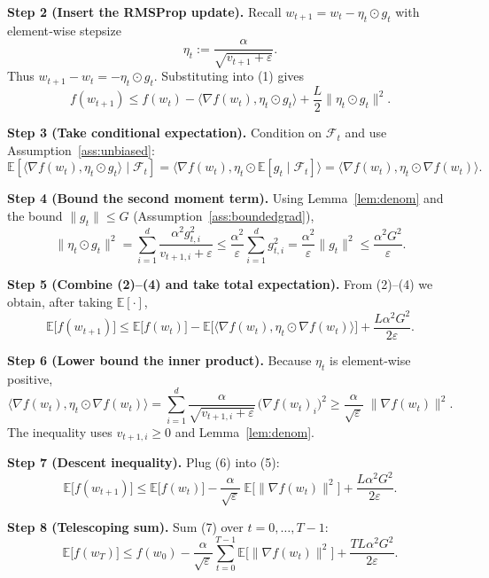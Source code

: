 \documentclass{article}
\newcommand{\EE}{\mathbb{E}}
\begin{document}
\noindent\textbf{Step 2 (Insert the RMSProp update).}  
Recall $w_{t+1}=w_{t}-\eta_{t}\odot g_{t}$ with element‑wise stepsize
\[
\eta_{t}:= \frac{\alpha}{\sqrt{v_{t+1}+\varepsilon}}.
\]
Thus $w_{t+1}-w_{t}= -\eta_{t}\odot g_{t}$. Substituting into (1) gives
\[
f(w_{t+1})\le f(w_{t})
- \big\langle\nabla f(w_{t}),\eta_{t}\odot g_{t}\big\rangle
+ \frac{L}{2}\|\eta_{t}\odot g_{t}\|^{2}.
\tag{2}
\]

\noindent\textbf{Step 3 (Take conditional expectation).}  
Condition on $\mathcal{F}_{t}$ and use Assumption~\ref{ass:unbiased}:
\[
\EE\!\left[\langle\nabla f(w_{t}),\eta_{t}\odot g_{t}\rangle\mid\mathcal{F}_{t}\right]
= \big\langle\nabla f(w_{t}),\eta_{t}\odot \EE[g_{t}\mid\mathcal{F}_{t}]\big\rangle
= \big\langle\nabla f(w_{t}),\eta_{t}\odot \nabla f(w_{t})\big\rangle.
\tag{3}
\]

\noindent\textbf{Step 4 (Bound the second moment term).}  
Using Lemma~\ref{lem:denom} and the bound $\|g_{t}\|\le G$ (Assumption~\ref{ass:boundedgrad}),
\[
\|\eta_{t}\odot g_{t}\|^{2}
= \sum_{i=1}^{d}\frac{\alpha^{2}g_{t,i}^{2}}{v_{t+1,i}+\varepsilon}
\le \frac{\alpha^{2}}{\varepsilon}\sum_{i=1}^{d}g_{t,i}^{2}
= \frac{\alpha^{2}}{\varepsilon}\|g_{t}\|^{2}
\le \frac{\alpha^{2}G^{2}}{\varepsilon}.
\tag{4}
\]

\noindent\textbf{Step 5 (Combine (2)–(4) and take total expectation).}  
From (2)–(4) we obtain, after taking $\EE[\cdot]$,
\[
\EE\!\big[f(w_{t+1})\big]
\le \EE\!\big[f(w_{t})\big]
- \EE\!\Big[\big\langle\nabla f(w_{t}),\eta_{t}\odot \nabla f(w_{t})\big\rangle\Big]
+ \frac{L\alpha^{2}G^{2}}{2\varepsilon}.
\tag{5}
\]

\noindent\textbf{Step 6 (Lower bound the inner product).}  
Because $\eta_{t}$ is element‑wise positive,
\[
\big\langle\nabla f(w_{t}),\eta_{t}\odot \nabla f(w_{t})\big\rangle
= \sum_{i=1}^{d}\frac{\alpha}{\sqrt{v_{t+1,i}+\varepsilon}}\,\big(\nabla f(w_{t})_{i}\big)^{2}
\ge \frac{\alpha}{\sqrt{\varepsilon}}\;\|\nabla f(w_{t})\|^{2}.
\tag{6}
\]
The inequality uses $v_{t+1,i}\ge0$ and Lemma~\ref{lem:denom}.

\noindent\textbf{Step 7 (Descent inequality).}  
Plug (6) into (5):
\[
\EE\!\big[f(w_{t+1})\big]
\le \EE\!\big[f(w_{t})\big]
- \frac{\alpha}{\sqrt{\varepsilon}}\;\EE\!\big[\|\nabla f(w_{t})\|^{2}\big]
+ \frac{L\alpha^{2}G^{2}}{2\varepsilon}.
\tag{7}
\]

\noindent\textbf{Step 8 (Telescoping sum).}  
Sum (7) over $t=0,\dots,T-1$:
\[
\EE\!\big[f(w_{T})\big]
\le f(w_{0})
- \frac{\alpha}{\sqrt{\varepsilon}}\sum_{t=0}^{T-1}\EE\!\big[\|\nabla f(w_{t})\|^{2}\big]
+ \frac{TL\alpha^{2}G^{2}}{2\varepsilon}.
\tag{8}
\]
\end{document}
